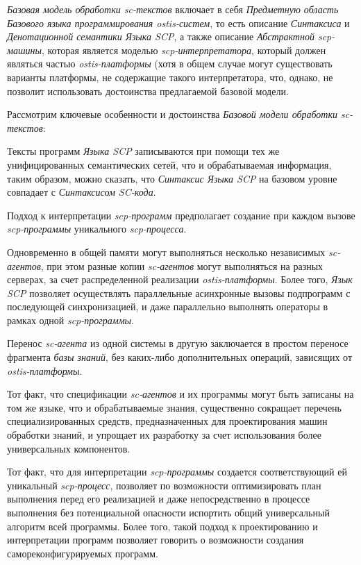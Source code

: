 \begin{SCn}
	\begin{scnindent}
	\end{scnindent}
\end{SCn}

\textit{Базовая модель обработки sc-текстов} включает в себя \textit{Предметную область Базового языка программирования ostis-систем}, то есть описание \textit{Синтаксиса} и \textit{Денотационной семантики Языка SCP}, а также описание \textit{Абстрактной scp-машины}, которая является моделью \textit{scp-интерпретатора}, который должен являться частью \textit{ostis-платформы} (хотя в общем случае могут существовать варианты платформы, не содержащие такого интерпретатора, что, однако, не позволит использовать достоинства предлагаемой базовой модели.

Рассмотрим ключевые особенности и достоинства \textit{Базовой модели обработки sc-текстов}:
\begin{textitemize}
	\item Тексты программ \textit{Языка SCP} записываются при помощи тех же унифицированных семантических сетей, что и обрабатываемая информация, таким образом, можно сказать, что \textit{Синтаксис Языка SCP} на базовом уровне совпадает с \textit{Синтаксисом SC-кода}.\item Подход к интерпретации \textit{scp-программ} предполагает создание при каждом вызове \textit{scp-программы} уникального \textit{scp-процесса}.
	\item Одновременно в общей памяти могут выполняться несколько независимых \textit{sc-агентов}, при этом разные копии \textit{sc-агентов} могут выполняться на разных серверах, за счет распределенной реализации \textit{ostis-платформы}. Более того, \textit{Язык SCP} позволяет осуществлять параллельные асинхронные вызовы подпрограмм с последующей синхронизацией, и даже параллельно	выполнять операторы в рамках одной \textit{scp-программы}.
	\item Перенос \textit{sc-агента} из одной системы в другую заключается в простом переносе фрагмента \textit{базы знаний}, без каких-либо дополнительных операций, зависящих от \textit{ostis-платформы}.
	\item Тот факт, что спецификации \textit{sc-агентов} и их программы могут быть записаны на том же языке, что и обрабатываемые знания, существенно сокращает перечень специализированных средств, предназначенных для проектирования машин обработки знаний, и упрощает их разработку за счет использования более универсальных компонентов.
	\item Тот факт, что для интерпретации \textit{scp-программы} создается соответствующий ей уникальный \textit{\mbox{scp-процесс}}, позволяет по возможности оптимизировать план выполнения перед его реализацией и даже непосредственно в процессе выполнения без потенциальной опасности испортить общий универсальный алгоритм всей программы. Более того, такой подход к проектированию и интерпретации программ позволяет говорить о возможности создания самореконфигурируемых программ.
\end{textitemize}

